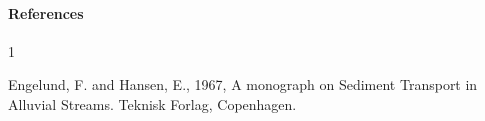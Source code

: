 \paragraph*{References}
\begin{thebibliography}{1}
	
	Engelund, F. and Hansen, E., 1967, A monograph on Sediment Transport in Alluvial Streams. Teknisk Forlag, Copenhagen.
	
\end{thebibliography}



